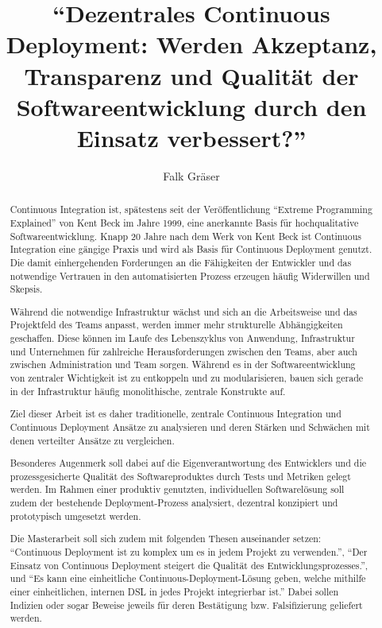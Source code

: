 \documentclass{article}
\begin{document}
\title{“Dezentrales Continuous Deployment: Werden Akzeptanz, Transparenz und Qualität der Softwareentwicklung durch den Einsatz verbessert?”}
\author{Falk Gräser}

\maketitle

\begin{abstract}
Continuous Integration ist, spätestens seit der Veröffentlichung “Extreme Programming Explained” von Kent Beck im Jahre 1999, eine anerkannte Basis für hochqualitative Softwareentwicklung. Knapp 20 Jahre nach dem Werk von Kent Beck ist Continuous Integration eine gängige Praxis und wird als Basis für Continuous Deployment genutzt. Die damit einhergehenden Forderungen an die Fähigkeiten der Entwickler und das notwendige Vertrauen in den automatisierten Prozess erzeugen häufig Widerwillen und Skepsis.

Während die notwendige Infrastruktur wächst und sich an die Arbeitsweise und das Projektfeld des Teams anpasst, werden immer mehr strukturelle Abhängigkeiten geschaffen. Diese können im Laufe des Lebenszyklus von Anwendung, Infrastruktur und Unternehmen für zahlreiche Herausforderungen zwischen den Teams, aber auch zwischen Administration und Team sorgen.
Während es in der Softwareentwicklung von zentraler Wichtigkeit ist zu entkoppeln und zu modularisieren, bauen sich gerade in der Infrastruktur häufig monolithische, zentrale Konstrukte auf.

Ziel dieser Arbeit ist es daher traditionelle, zentrale Continuous Integration und Continuous Deployment Ansätze zu analysieren und deren Stärken und Schwächen mit denen verteilter Ansätze zu vergleichen.

Besonderes Augenmerk soll dabei auf die Eigenverantwortung des Entwicklers und die prozessgesicherte Qualität des Softwareproduktes durch Tests und Metriken gelegt werden.
Im Rahmen einer produktiv genutzten, individuellen Softwarelösung soll zudem der bestehende Deployment-Prozess analysiert, dezentral konzipiert und prototypisch umgesetzt werden.

Die Masterarbeit soll sich zudem mit folgenden Thesen auseinander setzen:
“Continuous Deployment ist zu komplex um es in jedem Projekt zu verwenden.”,
“Der Einsatz von Continuous Deployment steigert die Qualität des Entwicklungsprozesses.”, und
“Es kann eine einheitliche Continuous-Deployment-Lösung geben, welche mithilfe einer einheitlichen, internen DSL in jedes Projekt integrierbar ist.”
Dabei sollen Indizien oder sogar Beweise jeweils für deren Bestätigung bzw. Falsifizierung geliefert werden.
\end{abstract}
\end{document}
